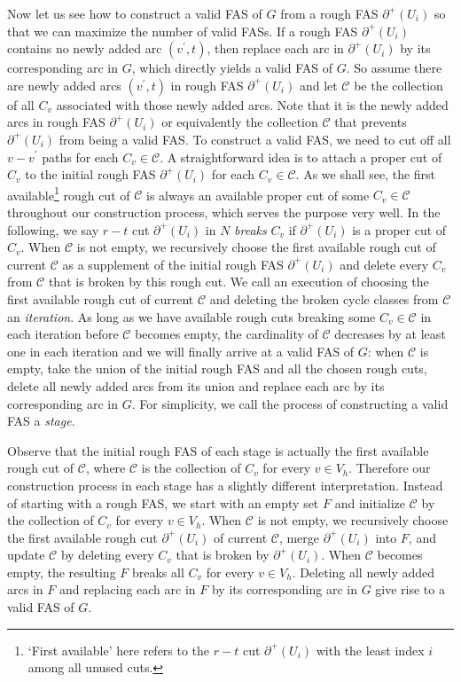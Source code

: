 \documentclass[11pt]{article}
\begin{document}
Now let us see how to construct a valid FAS of $G$ from a rough FAS $\partial^+(U_i)$ so that we can maximize the number of valid FASs. If a rough FAS $\partial^+(U_i)$ contains no newly added arc $(v^\prime,t)$, then replace each arc in $\partial^+(U_i)$ by its corresponding arc in $G$, which directly yields a valid FAS of $G$. So assume there are newly added arcs $(v^\prime,t)$ in rough FAS $\partial^+(U_i)$ and let $\mathcal{C}$ be the collection of all $C_v$ associated with those newly added arcs. Note that it is the newly added arcs in rough FAS $\partial^+(U_i)$ or equivalently the collection $\mathcal{C}$ that prevents $\partial^+(U_i)$ from being a valid FAS. To construct a valid FAS, we need to cut off all $v-v^\prime$ paths for each $C_v\in\mathcal{C}$. A straightforward idea is to attach a proper cut of $C_v$ to the initial rough FAS $\partial^+(U_i)$ for each $C_v\in \mathcal{C}$. As we shall see, the first available\footnote{`First available' here refers to the $r-t$ cut $\partial^+(U_i)$ with the least index $i$ among all unused cuts.} rough cut of $\mathcal{C}$ is always an available proper cut of some $C_v\in\mathcal{C}$ throughout our construction process, which serves the purpose very well. In the following, we say $r-t$ cut $\partial^+(U_i)$ in $N$ \emph{breaks} $C_v$ if $\partial^+(U_i)$ is a proper cut of $C_v$. When $\mathcal{C}$ is not empty, we recursively choose the first available rough cut of current $\mathcal{C}$ as a supplement of the initial rough FAS $\partial^+(U_i)$ and delete every $C_v$ from $\mathcal{C}$ that is broken by this rough cut. We call an execution of choosing the first available rough cut of current $\mathcal{C}$ and deleting the broken cycle classes from $\mathcal{C}$ an \emph{iteration}. As long as we have available rough cuts breaking some $C_v\in\mathcal{C}$ in each iteration before $\mathcal{C}$ becomes empty, the cardinality of $\mathcal{C}$ decreases by at least one in each iteration and we will finally arrive at a valid FAS of $G$: when $\mathcal{C}$ is empty, take the union of the initial rough FAS and all the chosen rough cuts, delete all newly added arcs from its union and replace each arc by its corresponding arc in $G$. For simplicity, we call the process of constructing a valid FAS a \emph{stage}.

Observe that the initial rough FAS of each stage is actually the first available rough cut of $\mathcal{C}$, where $\mathcal{C}$ is the collection of $C_v$ for every $v\in V_h$. Therefore our construction process in each stage has a slightly different interpretation. Instead of starting with a rough FAS, we start with an empty set $F$ and initialize $\mathcal{C}$ by the collection of $C_v$ for every $v\in V_h$. When $\mathcal{C}$ is not empty, we recursively choose the first available rough cut $\partial^+(U_i)$ of current $\mathcal{C}$, merge $\partial^+(U_i)$ into $F$, and update $\mathcal{C}$ by deleting every $C_v$ that is broken by $\partial^+(U_i)$. When $\mathcal{C}$ becomes empty, the resulting $F$ breaks all $C_v$ for every $v\in V_h$. Deleting all newly added arcs in $F$ and replacing each arc in $F$ by its corresponding arc in $G$ give rise to a valid FAS of $G$.
\end{document}
